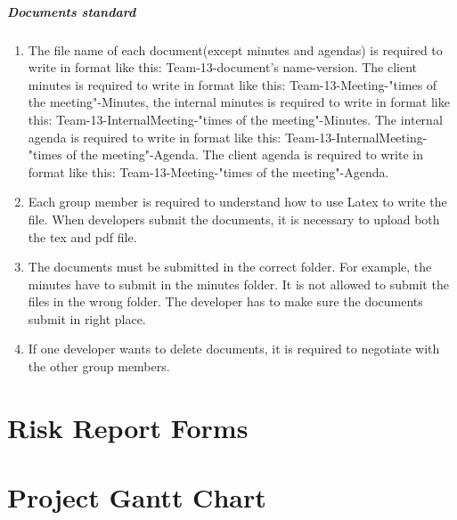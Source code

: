\documentclass[11pt, a4paper]{report}
\begin{document}
\paragraph{Documents standard}

\begin{enumerate}
	\item The file name of each document(except minutes and agendas) is required to write in format like this: Team-13-document's name-version. The client minutes is required to write in format like this:
	Team-13-Meeting-"times of the meeting"-Minutes, the internal minutes is required to write in format like this: Team-13-InternalMeeting-"times of the meeting"-Minutes. The internal agenda is required to write in format like this: Team-13-InternalMeeting-"times of the meeting"-Agenda. The client agenda is required to write in format like this: Team-13-Meeting-"times of the meeting"-Agenda. 
	\item Each group member is required to understand how to use Latex to write the file. When developers submit the documents, it is necessary to upload both the tex and pdf file.
	\item The documents must be submitted in the correct folder. For example, the minutes have to submit in the minutes folder. It is not allowed to submit the files in the wrong folder. The developer has to make sure the documents submit in right place. 
	\item If one developer wants to delete documents, it is required to negotiate with the other group members. 
\end{enumerate}

\pagebreak


\newpage
\appendix

\chapter{Risk Report Forms}



\chapter{Project Gantt Chart}

\end{document}
